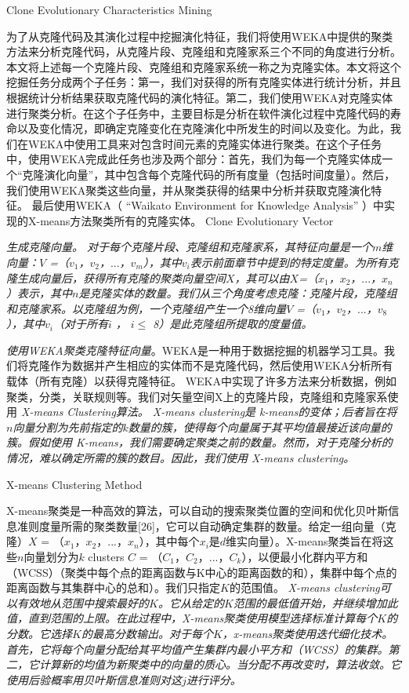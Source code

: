 {Clone Evolutionary Characteristics Mining}

为了从克隆代码及其演化过程中挖掘演化特征，我们将使用WEKA\cite{}中提供的聚类方法来分析克隆代码，从克隆片段、克隆组和克隆家系三个不同的角度进行分析。本文将上述每一个克隆片段、克隆组和克隆家系统一称之为克隆实体。本文将这个挖掘任务分成两个子任务：第一，我们对获得的所有克隆实体进行统计分析，并且根据统计分析结果获取克隆代码的演化特征。第二，我们使用WEKA对克隆实体进行聚类分析。在这个子任务中，主要目标是分析在软件演化过程中克隆代码的寿命以及变化情况，即确定克隆变化在克隆演化中所发生的时间以及变化。为此，我们在WEKA中使用工具来对包含时间元素的克隆实体进行聚类。在这个子任务中，使用WEKA完成此任务也涉及两个部分：首先，我们为每一个克隆实体成一个“克隆演化向量”，其中包含每个克隆代码的所有度量（包括时间度量）。然后，我们使用WEKA聚类这些向量，并从聚类获得的结果中分析并获取克隆演化特征。
最后使用WEKA（ “Waikato Environment for Knowledge Analysis” \cite{hall2009weka}）中实现的X-means\cite{pelleg2000x}方法聚类所有的克隆实体。
{Clone Evolutionary Vector}

 \em{ 生成克隆向量}。 对于每个克隆片段、克隆组和克隆家系，其特征向量是一个$m$维向量：{$V$ ={（$v_1$，$v_2$，$...$，$v_m$）}}，其中$v_i$表示前面章节中提到的特定度量。为所有克隆生成向量后，获得所有克隆的聚类向量空间$X$，其可以由{$X$={（$x_1$，$x_2$，$...$，$x_n$）}}表示，其中$n$是克隆实体的数量。我们从三个角度考虑克隆：克隆片段，克隆组和克隆家系。以克隆组为例，一个克隆组产生一个8维向量{$V$ =（$v_1$，$v_2$，$...$，$v_8$）}，其中$v_i$（对于所有$i$ ， $i \leq $ 8）是此克隆组所提取的度量值。
  
{ \em 使用WEKA聚类克隆特征向量}。WEKA是一种用于数据挖掘的机器学习工具。我们将克隆作为数据并产生相应的实体而不是克隆代码，然后使用WEKA分析所有载体（所有克隆）以获得克隆特征。 WEKA中实现了许多方法来分析数据，例如聚类，分类，关联规则等。我们对矢量空间X上的克隆片段，克隆组和克隆家系使用\em{ X-means Clustering}算法。 \em{ X-means clustering}是\em{ k-means}的变体；后者旨在将$ n $向量分割为先前指定的$ k $数量的簇，使得每个向量属于其平均值最接近该向量的簇。假如使用\em{ K-means}，我们需要确定聚类之前的数量。然而，对于克隆分析的情况，难以确定所需的簇的数目。因此，我们使用\em{ X-means clustering}。

{X-means Clustering Method}

X-means聚类是一种高效的算法，可以自动的搜索聚类位置的空间和优化贝叶斯信息准则度量所需的聚类数量\cite{}[26]，它可以自动确定集群的数量。给定一组向量（克隆）$X$ = {（$x_1$，$x_2$，$...$，$x_n$）}，其中每个$x_i$是$d$维实向量）。X-means聚类旨在将这些$n$向量划分为$k$ clusters $C$ = {（$C_1$，$C_2$，$...$，$C_k$）}，以便最小化群内平方和（WCSS）（聚类中每个点的距离函数与K中心的距离函数的和），集群中每个点的距离函数与其集群中心的总和）。我们只指定$ K $的范围值。 \em{ X-means clustering}可以有效地从范围中搜索最好的$K$。它从给定的$K$范围的最低值开始，并继续增加此值，直到范围的上限。在此过程中，X-means聚类使用模型选择标准计算每个$K$的分数。它选择$K$的最高分数输出。对于每个$K$，x-means聚类使用迭代细化技术。首先，它将每个向量分配给其平均值产生集群内最小平方和（WCSS）的集群。第二，它计算新的均值为新聚类中的向量的质心。当分配不再改变时，算法收敛。它使用后验概率用贝叶斯信息准则对这$j$进行评分。

